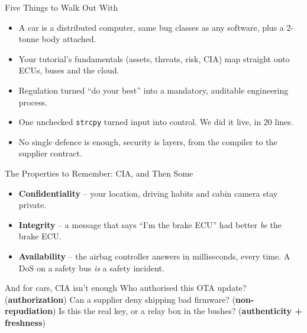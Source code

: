 
\begin{frame}{Five Things to Walk Out With}
  \begin{itemize}
    \item A car is a distributed computer, same bug classes as any software, plus a 2-tonne body attached.
    \item Your tutorial's fundamentals (assets, threats, risk, CIA) map straight onto ECUs, buses and the cloud.
    \item Regulation turned ``do your best'' into a mandatory, auditable engineering process.
    \item \alert{One unchecked \texttt{strcpy}} turned input into control. We did it live, in 20 lines.
    \item No single defence is enough, security is layers, from the compiler to the supplier contract.
  \end{itemize}
\end{frame}

\begin{frame}{The Properties to Remember: CIA, and Then Some}
  \begin{itemize}
    \item \textbf{Confidentiality} -- your location, driving habits and cabin camera stay private.
    \item \textbf{Integrity} -- a message that says ``I'm the brake ECU'' had better \emph{be} the brake ECU.
    \item \textbf{Availability} -- the airbag controller answers in milliseconds, every time. A DoS on a safety bus \emph{is} a safety incident.
  \end{itemize}
  \vspace{1mm}
  \begin{block}{And for cars, CIA isn't enough}
    Who authorised this OTA update? (\textbf{authorization}) Can a supplier deny shipping bad firmware? (\textbf{non-repudiation}) Is this the real key, or a relay box in the bushes? (\textbf{authenticity + freshness})
  \end{block}
\end{frame}

